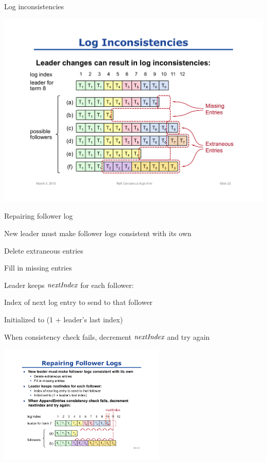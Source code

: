 \begin{frame}{Log inconsistencies}
	
\includegraphics[width=1.0\textwidth]{log-inconsistencies}

\end{frame}

\begin{frame}{Repairing follower log}
\BIL
\item New leader must make follower logs consistent with its own
	\BI
	\item Delete extraneous entries
	\item Fill in missing entries
	\EI
\item  Leader keeps $\textit{nextIndex}$ for each follower:
	\BI
	\item Index of next log entry to send to that follower
	\item Initialized to (1 + leader's last index)
	\EI
\item When \AppendRPC consistency check fails, decrement $\textit{nextIndex}$ and try again
\EI

\begin{center}
\includegraphics[width=0.6\textwidth]{repair-log1}
\end{center}


\end{frame}

